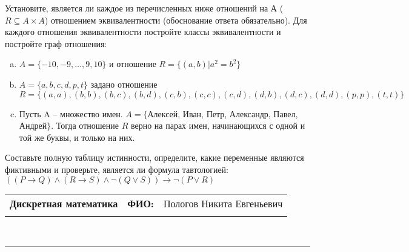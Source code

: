 \documentclass[10pt]{exam}
\newcommand{\class}{Дискретная математика}
\newcommand{\examdate}{}
\begin{document}
\begin{questions}
\question
Установите, является ли каждое из перечисленных ниже отношений на А ($R \subseteq A \times A$) отношением эквивалентности (обоснование ответа обязательно). Для каждого отношения эквивалентности постройте классы 
эквивалентности и постройте граф отношения:
\begin{enumerate} [a)]\setcounter{enumi}{0}
\item $A = \{-10, -9, … , 9, 10\}$ и отношение $R = \{(a,b)|a^{2} = b^{2}\}$
\item $A = \{a, b, c, d, p, t\}$ задано отношение $R = \{(a, a), (b, b), (b, c), (b, d), (c, b), (c, c), (c, d), (d, b), (d, c), (d, d), (p,p), (t,t)\}$
\item Пусть A – множество имен. $A = \{ $Алексей, Иван, Петр, Александр, Павел, Андрей$ \}$. Тогда отношение $R$ верно на парах имен, начинающихся с одной и той же буквы, и только на них.
\end{enumerate}\question Составьте полную таблицу истинности, определите, какие переменные являются фиктивными и проверьте, является ли формула тавтологией:
$((P \rightarrow Q) \land (R \rightarrow S) \land \neg (Q \lor S)) \rightarrow \neg (P \lor R)$

\end{questions}
\newpage
\begin{flushright}
\begin{tabular}{p{2.8in} r l}
\textbf{\class} & \textbf{ФИО:} &Пологов Никита Евгеньевич
\\

\textbf{\examdate} &&\\
\end{tabular}\\
\end{flushright}
\rule[1ex]{\textwidth}{.1pt}
\end{document}
